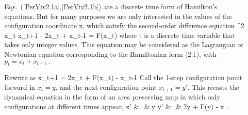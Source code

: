 Eqs.~(\ref{PerViv2.1a},\ref{PerViv2.1b}) are a discrete time form of Hamilton's
equations. But for many purposes we are only interested in the values of
the configuration coordinate x, which satisfy the second-order difference equation
\beq
\delta^2 x_t \equiv x_{t+1} - 2x_{t} + x_{t-1} = F(x_{t})  \qquad  {}
where t is a discrete time variable that takes only integer values. This
equation may be considered as the Lagrangian or Newtonian equation
corresponding to the Hamiltonian form (2.1), with
\(
p_t = x_{t} + x_{t-1} \,.
\)

Rewrite  as
\beq
 x_{t+1} =  2x_{t} + F(x_{t}) - x_{t-1} \qquad  {}
Call the 1-step configuration point forward in  $x_{t}=y$,
and the next configuration point $x_{t+1} = y'$.
This recasts the dynamical equation in the form of an area preserving map
in which only configurations at different times appear,
\bea
x' &=& y
    \continue
y' &=&  2y + F(y) - x  \qquad  {}
\,.
\label{PerViv2.4}
\eea

